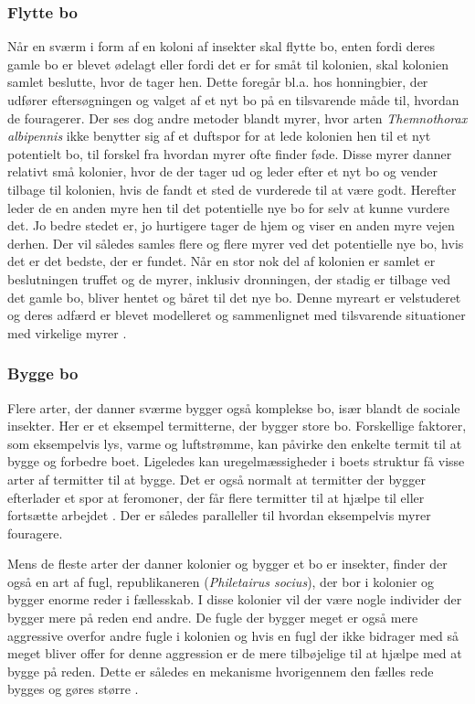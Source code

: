 \subsubsection{Flytte bo}
Når en sværm i form af en koloni af insekter skal flytte bo, enten fordi deres gamle bo er blevet ødelagt eller fordi det er for småt til kolonien, skal kolonien samlet beslutte, hvor de tager hen. Dette foregår bl.a. hos honningbier, der udfører eftersøgningen og valget af et nyt bo på en tilsvarende måde til, hvordan de fouragerer. Der ses dog andre metoder blandt myrer, hvor arten \textit{Themnothorax albipennis} ikke benytter sig af et duftspor for at lede kolonien hen til et nyt potentielt bo, til forskel fra hvordan myrer ofte finder føde. Disse myrer danner relativt små kolonier, hvor de der tager ud og leder efter et nyt bo og vender tilbage til kolonien, hvis de fandt et sted de vurderede til at være godt. Herefter leder de en anden myre hen til det potentielle nye bo for selv at kunne vurdere det. Jo bedre stedet er, jo hurtigere tager de hjem og viser en anden myre vejen derhen. Der vil således samles flere og flere myrer ved det potentielle nye bo, hvis det er det bedste, der er fundet. Når en stor nok del af kolonien er samlet er beslutningen truffet og de myrer, inklusiv dronningen, der stadig er tilbage ved det gamle bo, bliver hentet og båret til det nye bo. Denne myreart er velstuderet og deres adfærd er blevet modelleret og sammenlignet med tilsvarende situationer med virkelige myrer \cite{beekman2008biological} \cite{pratt2005agent}. 

\subsubsection{Bygge bo}
Flere arter, der danner sværme bygger også komplekse bo, især blandt de sociale insekter. Her er et eksempel termitterne, der bygger store bo. Forskellige faktorer, som eksempelvis lys, varme og luftstrømme, kan påvirke den enkelte termit til at bygge og forbedre boet. Ligeledes kan uregelmæssigheder i boets struktur få visse arter af termitter til at bygge. Det er også normalt at termitter der bygger efterlader et spor at feromoner, der får flere termitter til at hjælpe til eller fortsætte arbejdet \cite{farago2014biocommunication}.  Der er således paralleller til hvordan eksempelvis myrer fouragere. \par
Mens de fleste arter der danner kolonier og bygger et bo er insekter, finder der også en art af fugl, republikaneren (\textit{Philetairus socius}), der bor i kolonier og bygger enorme reder i fællesskab. I disse kolonier vil der være nogle individer der bygger mere på reden end andre. De fugle der bygger meget er også mere aggressive overfor andre fugle i kolonien og hvis en fugl der ikke bidrager med så meget bliver offer for denne aggression er de mere tilbøjelige til at hjælpe med at bygge på reden. Dette er således en mekanisme hvorigennem den fælles rede bygges og gøres større \cite{leighton2016sociable}.

